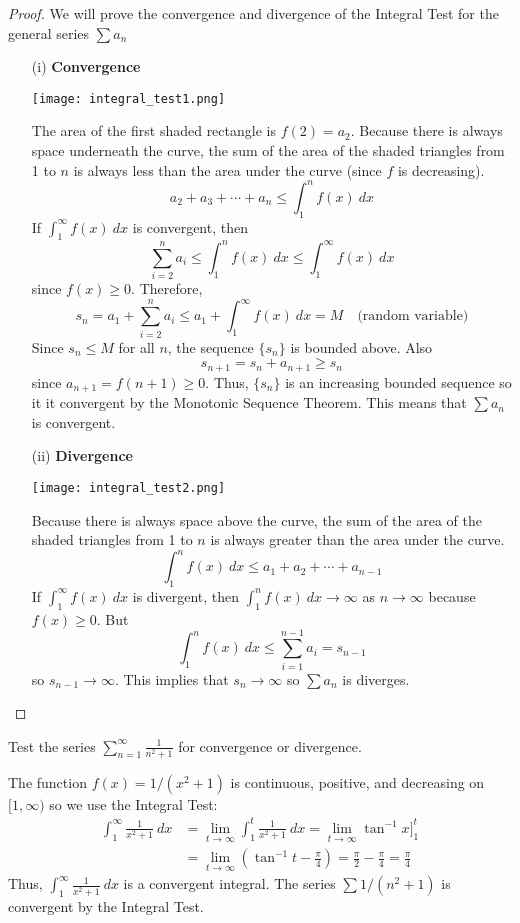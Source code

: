   \begin{proof}\let\qed\relax
    We will prove the convergence and divergence of the Integral Test for the general series $\sum a_n$
    \begin{enumerate}
      \item[(i)] \textbf{Convergence}
      \begin{center}
        \texttt{[image: integral\_test1.png]}
      \end{center}
      The area of the first shaded rectangle is $f(2)=a_2$. Because there is always space underneath the curve, the sum of the area of the shaded triangles from 1 to $n$ is always less than the area under the curve (since $f$ is decreasing).
      $$ a_2 + a_3 + \cdots + a_n \leq \int_{1}^{n} f(x)\ dx$$
      If $\int_{1}^{\infty} f(x)\ dx$ is convergent, then
      $$ \sum_{i=2}^{n} a_i \leq \int_{1}^{n} f(x)\ dx \leq \int_{1}^{\infty} f(x)\ dx $$
      since $f(x) \geq 0$. Therefore,
      $$ s_n = a_1 + \sum_{i=2}^{n} a_i \leq a_1 + \int_{1}^{\infty} f(x)\ dx = M \quad \text{(random variable)}$$
      Since $s_n \leq M$ for all $n$, the sequence $\{s_n\}$ is bounded above. Also
      $$ s_{n+1} = s_n + a_{n+1} \geq s_n $$
      since $a_{n+1} = f(n+1) \geq 0$. Thus, $\{s_n\}$ is an increasing bounded sequence so it it convergent by the Monotonic Sequence Theorem. This means that $\sum a_n$ is convergent.
      \item[(ii)] \textbf{Divergence}
      \begin{center}
        \texttt{[image: integral\_test2.png]}
      \end{center}
      Because there is always space above the curve, the sum of the area of the shaded triangles from 1 to $n$ is always greater than the area under the curve.
      $$ \int_{1}^{n} f(x)\ dx \leq a_1 + a_2 + \cdots + a_{n-1}$$
      If $\int_{1}^{\infty} f(x)\ dx$ is divergent, then $\int_{1}^{n} f(x)\ dx \to \infty$ as $n\to\infty$ because $f(x)\geq0$. But
      $$ \int_{1}^{n} f(x)\ dx \leq \sum_{i=1}^{n-1} a_i = s_{n-1} $$
      so $s_{n-1} \to \infty$. This implies that $s_n \to \infty$ so $\sum a_n$ is diverges.
    \end{enumerate}
  \end{proof}
  \begin{example}
  Test the series $\displaystyle\sum_{n=1}^{\infty} \frac{1}{n^2 +1}$ for convergence or divergence.
  \end{example}
  \begin{solution}
    The function $f(x) = 1/(x^2 + 1)$ is continuous, positive, and decreasing on $[1,\infty)$ so we use the Integral Test:
    \begin{align*}
      \int_{1}^{\infty} \frac{1}{x^2 + 1}\ dx &= \lim_{t\to\infty} \int_{1}^{t} \frac{1}{x^2 + 1}\ dx = \lim_{t\to\infty} \tan^{-1} x \Big]_{1}^{t} \\
      &= \lim_{t\to\infty} \left(\tan^{-1} t - \frac{\pi}{4}\right) = \frac{\pi}{2}-\frac{\pi}{4} = \frac{\pi}{4}
    \end{align*}
    Thus, $\int_{1}^{\infty} \frac{1}{x^2 + 1}\ dx$ is a convergent integral. The series $\sum 1/(n^2 +1)$ is convergent by the Integral Test.
  \end{solution}
